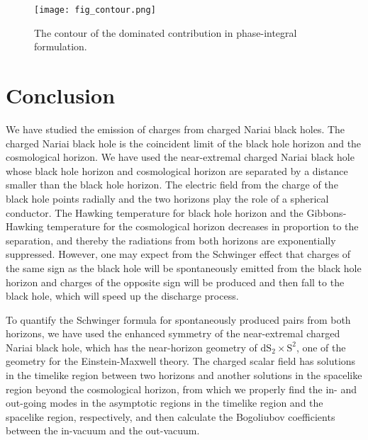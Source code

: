 \documentclass[aps,nofootinbib,superscriptaddress
]{revtex4}
\begin{document}
\begin{figure}
\texttt{[image: fig\_contour.png]}
\caption{The contour of the dominated contribution in phase-integral formulation.}
\label{fig_contour}
\end{figure}


\section{Conclusion}

We have studied the emission of charges from charged Nariai black holes. The charged Nariai black hole is the coincident limit of the black hole horizon and the cosmological horizon. We have used the near-extremal charged Nariai black hole whose black hole horizon and cosmological horizon are separated by a distance smaller than the black hole horizon. The electric field from the charge of the black hole points radially and the two horizons play the role of a spherical conductor. The Hawking temperature for black hole horizon and the Gibbons-Hawking temperature for the cosmological horizon decreases in proportion to the separation, and thereby the radiations from both horizons are exponentially suppressed. However, one may expect from the Schwinger effect that charges of the same sign as the black hole will be spontaneously emitted from the black hole horizon and charges of the opposite sign will be produced and then fall to the black hole, which will speed up the discharge process.


To quantify the Schwinger formula for spontaneously produced pairs from both horizons, we have used the enhanced symmetry of the near-extremal charged Nariai black hole, which has the near-horizon geometry of $\mathrm{dS}_2 \times \mathrm{S}^2$, one of the geometry for the Einstein-Maxwell theory. The charged scalar field has solutions in the timelike region between two horizons and another solutions in the spacelike region beyond the cosmological horizon, from which we properly find the in- and out-going modes in the asymptotic regions in the timelike region and the spacelike region, respectively, and then calculate the Bogoliubov coefficients between the in-vacuum and the out-vacuum.
\end{document}

